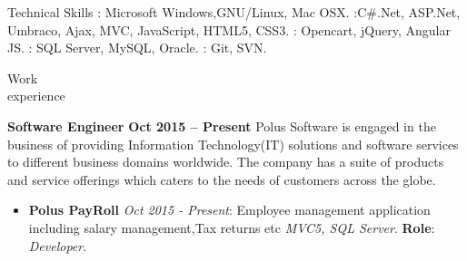\documentclass{resume}
\author{Babin Babu}
\begin{document}
\maketitle


\begin{category}{Technical Skills}
  :  Microsoft Windows,GNU/Linux, Mac OSX.
  :C#.Net, ASP.Net, Umbraco, Ajax, MVC, JavaScript, HTML5, CSS3.
  : Opencart, jQuery, Angular JS.
  : SQL Server, MySQL, Oracle.
  : Git, SVN.
\end{category}


\begin{category}{Work \\experience}

  \citemnobullet \textbf{Software Engineer} \hfill \textbf{Oct 2015 -- Present }
  \citemnobullet Polus Software is engaged in the business of  providing Information Technology(IT) solutions and software services to different business domains worldwide. The company has a suite of products and service offerings which caters to the needs of customers across the globe. 
\begin{itemize}
  \item \textbf{Polus PayRoll} {\em Oct 2015 - Present}: Employee management application including salary management,Tax returns etc {\em MVC5,  SQL Server}. \textbf{Role}: {\em Developer}.
    \end{itemize}
    

\end{category}
\end{document}
